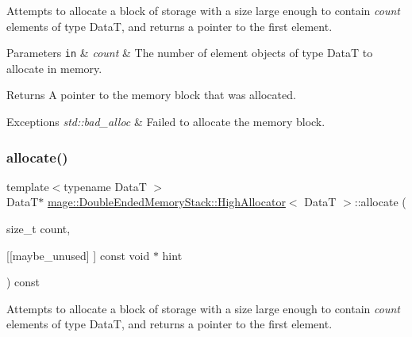 Attempts to allocate a block of storage with a size large enough to contain {\itshape count} elements of type {\ttfamily DataT}, and returns a pointer to the first element.


\begin{DoxyParams}[1]{Parameters}
\mbox{\tt in}  & {\em count} & The number of element objects of type {\ttfamily DataT} to allocate in memory. \\
\hline
\end{DoxyParams}
\begin{DoxyReturn}{Returns}
A pointer to the memory block that was allocated. 
\end{DoxyReturn}

\begin{DoxyExceptions}{Exceptions}
{\em std\+::bad\+\_\+alloc} & Failed to allocate the memory block. \\
\hline
\end{DoxyExceptions}
\mbox{\label{classmage_1_1_double_ended_memory_stack_1_1_high_allocator_aa9a062e9a044a1695f171a7d801352e8}} 
\subsubsection{\texorpdfstring{allocate()}{allocate()}\hspace{0.1cm}{\footnotesize\ttfamily [2/2]}}
{\footnotesize\ttfamily template$<$typename DataT $>$ \\
DataT$\ast$ \mbox{\hyperlink{classmage_1_1_double_ended_memory_stack_1_1_high_allocator}{mage\+::\+Double\+Ended\+Memory\+Stack\+::\+High\+Allocator}}$<$ DataT $>$\+::allocate (\begin{DoxyParamCaption}\item[{size\+\_\+t}]{count,  }\item[{\mbox{[}\mbox{[}maybe\+\_\+unused\mbox{]} \mbox{]} const void $\ast$}]{hint }\end{DoxyParamCaption}) const}

Attempts to allocate a block of storage with a size large enough to contain {\itshape count} elements of type {\ttfamily DataT}, and returns a pointer to the first element.


